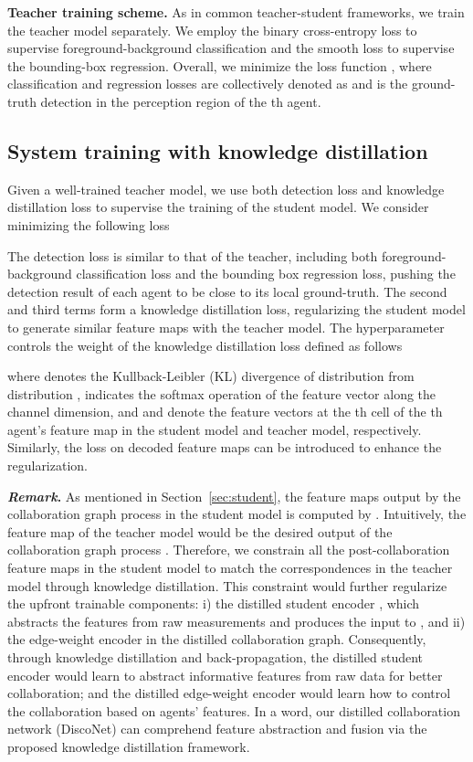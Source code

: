 \documentclass{article}
\newcommand{\mypar}[1]{{\bf #1.}}
\begin{document}
\mypar{Teacher training scheme} 
As in common teacher-student frameworks, we train the teacher model separately. We employ the binary cross-entropy loss to supervise foreground-background classification and the smooth  loss to supervise the bounding-box regression.  Overall, we minimize the loss function , where classification and regression losses are collectively denoted as  and  is the ground-truth detection in the perception region of the th agent.

\vspace{-3mm}
\subsection{System training with knowledge distillation}
\vspace{-3mm}

Given a well-trained teacher model, we use both detection loss and knowledge distillation loss to supervise the training of the student model. We consider minimizing the following loss
\vspace{-2mm}

The detection loss  is similar to that of the teacher, including both foreground-background classification loss and the bounding box regression loss, pushing the detection result of each agent to be close to its local ground-truth. The second and third terms form a knowledge distillation loss, regularizing the student model to generate similar feature maps with the teacher model. The hyperparameter  controls the weight of the knowledge distillation loss  defined as follows
\vspace{-2mm}
 
where  denotes the Kullback-Leibler (KL) divergence of distribution  from distribution ,  indicates the softmax operation of the feature vector along the channel dimension, and  and  denote the feature vectors at the th cell of the th agent's feature map in the student model and teacher model, respectively. Similarly, the loss on decoded feature maps  can be introduced to enhance the regularization.

\textbf{\emph{Remark}.} 
As mentioned in Section~\ref{sec:student}, the feature maps output by the collaboration graph process in the student model is computed by  . Intuitively, the feature map of the teacher model  would be the desired output of the collaboration graph process . Therefore, we constrain all the post-collaboration feature maps in the student model to match the correspondences in the teacher model through knowledge distillation. This constraint would further regularize the upfront trainable components: i) the distilled student encoder , which abstracts the features from raw measurements and produces the input to , and ii) the edge-weight encoder  in the distilled collaboration graph. Consequently, through knowledge distillation and back-propagation, the distilled student encoder would learn to abstract informative features from raw data for better collaboration; and the distilled edge-weight encoder would learn how to control the collaboration based on agents' features. In a word, our distilled collaboration network (DiscoNet) can comprehend feature abstraction and fusion via the proposed knowledge distillation framework.
\end{document}
